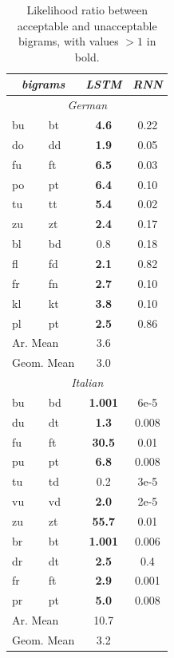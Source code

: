 \begin{table}[t]
  \begin{center}
    \begin{tabular}{ll|cc}
      \multicolumn{2}{c}{\emph{bigrams}}&\emph{LSTM}&\emph{RNN}\\
      \hline
      \multicolumn{4}{c}{\emph{German}}\\
      \hline
           bu &  bt &  \textbf{ 4.6} &  0.22     \\
           do &  dd &  \textbf{ 1.9} &  0.05     \\
           fu &  ft &  \textbf{ 6.5} &  0.03     \\
           po &  pt &  \textbf{ 6.4} &  0.10     \\
           tu &  tt &  \textbf{ 5.4} &  0.02     \\
           zu &  zt &  \textbf{ 2.4} &  0.17     \\ \hline
           bl &  bd &   0.8          & 0.18       \\
           fl &  fd &  \textbf{ 2.1} & 0.82      \\
           fr &  fn &  \textbf{ 2.7} & 0.10      \\
           kl &  kt &  \textbf{ 3.8} & 0.10      \\
           pl &  pt &  \textbf{ 2.5} & 0.86      \\
	    \multicolumn{2}{l|}{Ar. Mean}      & 3.6 \\
	    \multicolumn{2}{l|}{Geom. Mean} & 3.0 \\
      \hline
      \multicolumn{4}{c}{\emph{Italian}}\\
      \hline
	    bu & bd & \textbf{ 1.001} & 6e-5 \\
	    du & dt & \textbf{ 1.3} & 0.008 \\
	    fu & ft & \textbf{ 30.5} & 0.01 \\
	    pu & pt & \textbf{ 6.8} & 0.008 \\
	    tu & td &  0.2 & 3e-5 \\
	    vu & vd & \textbf{ 2.0} & 2e-5 \\
	    zu & zt & \textbf{ 55.7} & 0.01 \\ \hline
	    br & bt & \textbf{ 1.001}  &  0.006 \\
	    dr & dt & \textbf{ 2.5} & 0.4 \\
	    fr & ft & \textbf{ 2.9} & 0.001 \\
	    pr & pt & \textbf{ 5.0} & 0.008 \\
	    \multicolumn{2}{l|}{Ar. Mean} & 10.7 \\
	    \multicolumn{2}{l|}{Geom. Mean} & 3.2 \\
    \end{tabular}
  \end{center}
  \caption{\label{tab:phonotactics-results} Likelihood ratio between acceptable and unacceptable bigrams,    with values $>1$ in bold.}
\end{table}

